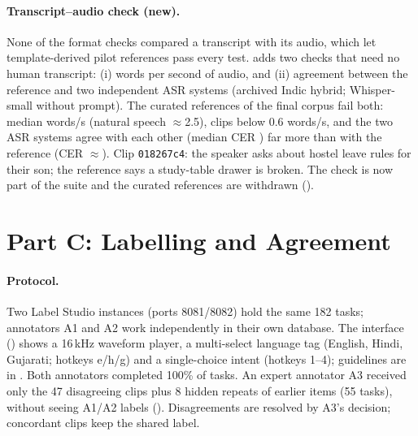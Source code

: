 \documentclass[sigconf,authordraft]{acmart}
\begin{document}
\paragraph{Transcript--audio check (new).}
None of the format checks compared a transcript with its audio, which let template-derived pilot references pass every test.  adds two checks that need no human transcript: (i) words per second of audio, and (ii) agreement between the reference and two independent ASR systems (archived Indic hybrid; Whisper-small without prompt). The curated references of the final corpus fail both: median \RefWps{} words/s (natural speech $\approx$2.5), \RefLow{} clips below 0.6 words/s, and the two ASR systems agree with each other (median CER \RefCerXasr{}) far more than with the reference (CER $\approx$\RefCerCur{}). Clip \texttt{018267c4}: the speaker asks about hostel leave rules for their son; the reference says a study-table drawer is broken. The check is now part of the suite and the curated references are withdrawn ().

\section{Part C: Labelling and Agreement}\label{sec:label}
\paragraph{Protocol.}
Two Label Studio instances (ports 8081/8082) hold the same 182 tasks; annotators A1 and A2 work independently in their own database. The interface () shows a 16\,kHz waveform player, a multi-select language tag (English, Hindi, Gujarati; hotkeys e/h/g) and a single-choice intent (hotkeys 1--4); guidelines are in . Both annotators completed 100\% of tasks. An expert annotator A3 received only the 47 disagreeing clips plus 8 hidden repeats of earlier items (55 tasks), without seeing A1/A2 labels (). Disagreements are resolved by A3's decision; concordant clips keep the shared label.
\end{document}
